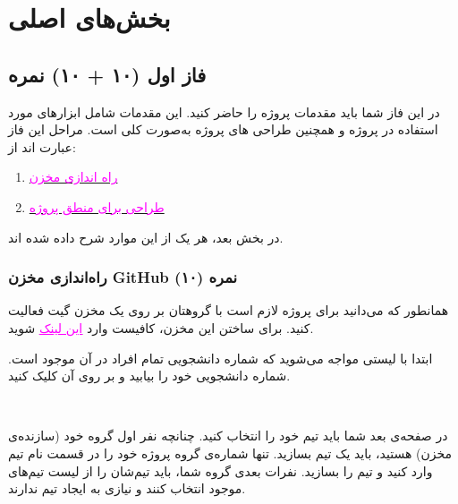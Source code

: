 \documentclass[]{article}
\begin{document}
\section*{{\titr بخش‌های اصلی }}


\subsection*{{\titr فاز اول} (۱۰ + ۱۰) نمره} 

در این فاز شما باید مقدمات پروژه را حاضر کنید. این مقدمات شامل ابزارهای مورد استفاده در پروژه و همچنین طراحی  های پروژه به‌صورت کلی است. مراحل این فاز عبارت اند از:

\begin{enumerate}
	\item
	\hyperref[subsubsec:github]{\textcolor{magenta}{راه اندازی مخزن }}
	
	\item
	\hyperref[subsubsec:fsm]{\textcolor{magenta}{طراحی  برای منطق پروژه}}
\end{enumerate}

در بخش بعد، هر یک از این موارد شرح داده شده اند.



\subsubsection*{{\titr راه‌اندازی مخزن GitHub} (۱۰) نمره}
\label{subsubsec:github}

همانطور که می‌دانید برای پروژه لازم است با گروهتان بر روی یک مخزن  گیت فعالیت کنید. برای ساختن این مخزن، کافیست وارد
\href{https://classroom.github.com/a/rBR982eM}{\textcolor{magenta}{\underline{این لینک}}} 
شوید.

ابتدا با لیستی مواجه می‌شوید که شماره دانشجویی تمام افراد در آن موجود است. شماره دانشجویی خود را بیابید و بر روی آن کلیک کنید.

\newpage
\Large \textbf{\\
}

در صفحه‌ی بعد شما باید تیم خود را انتخاب کنید. چنانچه نفر اول گروه خود (سازنده‌ی مخزن) هستید، باید یک تیم بسازید. تنها شماره‌ی گروه پروژه خود را در قسمت نام تیم وارد کنید و تیم را بسازید. نفرات بعدی گروه شما، باید تیم‌شان را از لیست تیم‌های موجود انتخاب کنند و نیازی به ایجاد تیم ندارند.
\end{document}
